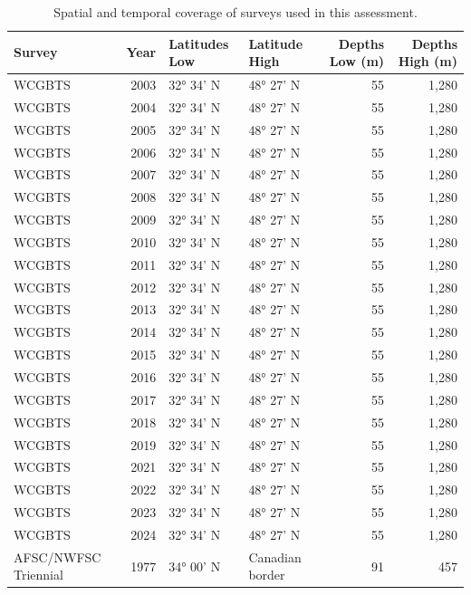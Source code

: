 \documentclass[
]{scrartcl}
\begin{document}
\begin{longtable}{lrllrr}

\caption{\label{tbl-survey_coverage}Spatial and temporal coverage of
surveys used in this assessment.}

\tabularnewline

\toprule
Survey & Year & Latitudes Low & Latitude High & Depths Low (m) & Depths High (m) \\ 
\midrule\addlinespace[2.5pt]
WCGBTS & 2003 &  32° 34' N & 48° 27' N & 55 & 1,280 \\ 
WCGBTS & 2004 &  32° 34' N & 48° 27' N & 55 & 1,280 \\ 
WCGBTS & 2005 &  32° 34' N & 48° 27' N & 55 & 1,280 \\ 
WCGBTS & 2006 &  32° 34' N & 48° 27' N & 55 & 1,280 \\ 
WCGBTS & 2007 &  32° 34' N & 48° 27' N & 55 & 1,280 \\ 
WCGBTS & 2008 &  32° 34' N & 48° 27' N & 55 & 1,280 \\ 
WCGBTS & 2009 &  32° 34' N & 48° 27' N & 55 & 1,280 \\ 
WCGBTS & 2010 &  32° 34' N & 48° 27' N & 55 & 1,280 \\ 
WCGBTS & 2011 &  32° 34' N & 48° 27' N & 55 & 1,280 \\ 
WCGBTS & 2012 &  32° 34' N & 48° 27' N & 55 & 1,280 \\ 
WCGBTS & 2013 &  32° 34' N & 48° 27' N & 55 & 1,280 \\ 
WCGBTS & 2014 &  32° 34' N & 48° 27' N & 55 & 1,280 \\ 
WCGBTS & 2015 &  32° 34' N & 48° 27' N & 55 & 1,280 \\ 
WCGBTS & 2016 &  32° 34' N & 48° 27' N & 55 & 1,280 \\ 
WCGBTS & 2017 &  32° 34' N & 48° 27' N & 55 & 1,280 \\ 
WCGBTS & 2018 &  32° 34' N & 48° 27' N & 55 & 1,280 \\ 
WCGBTS & 2019 &  32° 34' N & 48° 27' N & 55 & 1,280 \\ 
WCGBTS & 2021 &  32° 34' N & 48° 27' N & 55 & 1,280 \\ 
WCGBTS & 2022 &  32° 34' N & 48° 27' N & 55 & 1,280 \\ 
WCGBTS & 2023 &  32° 34' N & 48° 27' N & 55 & 1,280 \\ 
WCGBTS & 2024 &  32° 34' N & 48° 27' N & 55 & 1,280 \\ 
AFSC/NWFSC Triennial & 1977 &  34° 00' N & Canadian border & 91 & 457 \\ 

\end{longtable}
\end{document}
